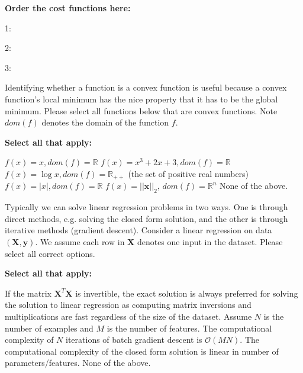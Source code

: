 \documentclass[11pt,addpoints,answers]{exam}
\numberwithin{equation}{section} %
\numberwithin{figure}{section} %
\numberwithin{table}{section} %
\newcommand{\xv}{\mathbf{x}}
\newcommand{\yv}{\mathbf{y}}
\newcommand{\Xv}{\mathbf{X}}
\begin{document}
\begin{questions}
\textbf{Order the cost functions here:}

    1: \quad
    \begin{tcolorbox}[fit,height=1cm, width=2cm, blank, borderline={1pt}{-2pt},nobeforeafter]
    \end{tcolorbox}
    
    
    2: \quad
    \begin{tcolorbox}[fit,height=1cm, width=2cm, blank, borderline={1pt}{-2pt},nobeforeafter]
    \end{tcolorbox}
    
    
    3: \quad
    \begin{tcolorbox}[fit,height=1cm, width=2cm, blank, borderline={1pt}{-2pt},nobeforeafter]
    \end{tcolorbox}
    
    
    \newpage
    

    
    \question[3] Identifying whether a function is a convex function is useful because a convex function's local minimum has the nice property that it has to be the global minimum. Please select all functions below that are convex functions. Note $dom(f)$ denotes the domain of the function $f$. \\
        {%
    \checkboxchar{$\Box$} \checkedchar{$\blacksquare$}
    \textbf{Select all that apply:}
    \begin{checkboxes}
        \choice $f(x) = x, dom(f) = \mathbb{R}$
        \choice $f(x) = x^3 + 2x + 3, dom(f) = \mathbb{R}$
        \choice $f(x) = \log x, dom(f) = \mathbb{R}_{++}$ (the set of positive real numbers)
        \choice $f(x) = |x|, dom(f) = \mathbb{R}$
        \choice $f(x) = ||\xv||_2,\, dom(f) = \mathbb{R}^n$
        \choice None of the above.
    \end{checkboxes}
    }


    \question[2] Typically we can solve linear regression problems in two ways. One is through direct methods, e.g. solving the closed form solution, and the other is through iterative methods (gradient descent). Consider a linear regression on data $(\Xv, \yv)$. We assume each row in $\Xv$ denotes one input in the dataset. Please select all correct options.
    
    \textbf{Select all that apply:}
        {%
    \checkboxchar{$\Box$} \checkedchar{$\blacksquare$}
    \begin{checkboxes}
        \choice If the matrix $\Xv^T\Xv$ is invertible, the exact solution is always preferred for solving the solution to linear regression as computing matrix inversions and multiplications are fast regardless of the size of the dataset.
        \choice Assume $N$ is the number of examples and $M$ is the number of features. The computational complexity of $N$ iterations of batch gradient descent is $\mathcal{O}(MN)$.
        \choice The computational complexity of the closed form solution is linear in number of parameters/features.
        \choice None of the above.
    \end{checkboxes}
    }
    

\end{questions}
\end{document}

